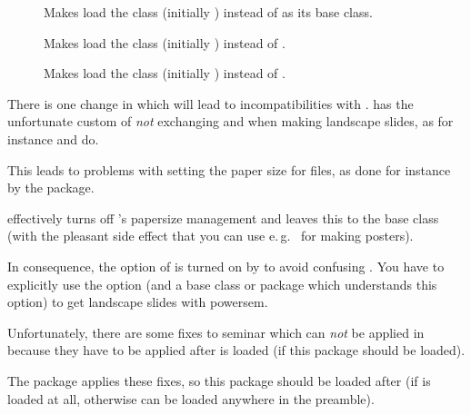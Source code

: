 \begin{slide}
\begin{description}
\item[]
  Makes  load the class  (initially ) instead of
   as its base class.

\item[]
  Makes  load the class  (initially ) instead of
  .

\item[]
  Makes  load the class  (initially ) instead of
  .

\end{description}

There is one change in  which will lead to incompatibilities with .  has the
unfortunate custom of \emph{not} exchanging  and  when making landscape
slides, as for instance  and  do.

This leads to problems with setting the paper size for  files, as done for instance by the 
package.

 effectively turns off 's papersize management and leaves this to the base class (with the
pleasant side effect that you can use e.\,g.\  for making posters).

In consequence, the  option of  is turned on by  to avoid confusing
. You have to explicitly use the  option (and a base class or package which understands
this option) to get landscape slides with powersem.

\newslide

Unfortunately, there are some fixes to seminar which can \emph{not} be applied in  because they have to
be applied after  is loaded (if this package should be loaded).

The package  applies these fixes, so this package should be loaded after  (if
 is loaded at all, otherwise  can be loaded anywhere in the preamble).


\end{slide}
